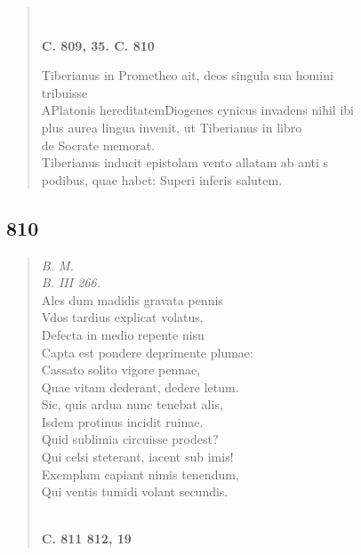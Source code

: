 \documentclass[11pt, a4paper]{report}
\begin{document}
\begin{verse}
        ﻿\pagebreak 
     \marginpar{[298]} \begin{center} \textbf{C. 809, 35. C. 810} \end{center}Tiberianus in Prometheo ait, deos singula sua homini \\ tribuisse \\ APlatonis hereditatemDiogenes cynicus invadens nihil ibi \\ plus aurea lingua invenit, ut Tiberianus in libro \\ de Socrate memorat. \\ Tiberianus inducit epistolam vento allatam ab anti s \\ podibus, quae habet: Superi inferis salutem. \\ 
      \end{verse}
  
            \subsection*{810}
      \begin{verse}
      \textit{B. M.} \\ \textit{B. III 266.} \\ Ales dum madidis gravata pennis \\ Vdos tardius explicat volatus, \\ Defecta in medio repente nisu \\ Capta est pondere deprimente plumae: \\ Cassato solito vigore pennae, \\ Quae vitam dederant, dedere letum. \\ Sic, quis ardua nunc tenebat alis, \\ Isdem protinus incidit ruinae. \\ Quid sublimia circuisse prodest? \\ Qui celsi steterant, iacent sub imis! \\ Exemplum capiant nimis tenendum, \\ Qui ventis tumidi volant secundis. \\ 
        ﻿\pagebreak 
     \marginpar{[299]} \begin{center} \textbf{C. 811 812, 19} \end{center}
      \end{verse}
  
\end{document}
